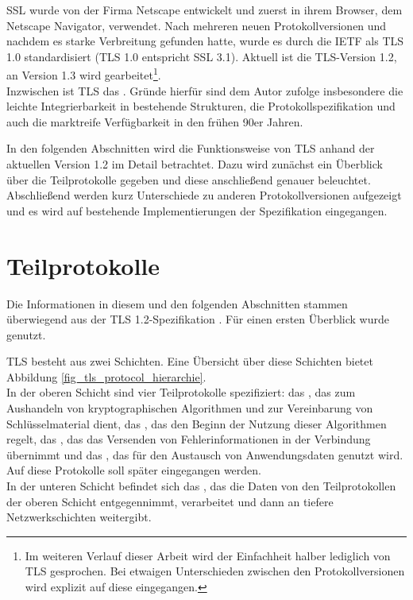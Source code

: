 SSL wurde von der Firma Netscape entwickelt und zuerst in ihrem Browser, dem Netscape Navigator, verwendet. Nach mehreren neuen Protokollversionen und nachdem es starke Verbreitung gefunden hatte, wurde es durch die IETF als TLS 1.0 standardisiert (TLS 1.0 entspricht SSL 3.1). Aktuell ist die TLS-Version 1.2, an Version 1.3 wird gearbeitet\footnote{
	Im weiteren Verlauf dieser Arbeit wird der Einfachheit halber lediglich von TLS gesprochen. Bei etwaigen Unterschieden zwischen den Protokollversionen wird explizit auf diese eingegangen.
}.\\
Inzwischen ist TLS das  \cite{schmeh09}. Gründe hierfür sind dem Autor zufolge insbesondere die leichte Integrierbarkeit in bestehende Strukturen, die  \cite{schmeh09} Protokollspezifikation und auch die marktreife Verfügbarkeit in den frühen 90er Jahren.

In den folgenden Abschnitten wird die Funktionsweise von TLS anhand der aktuellen Version 1.2 im Detail betrachtet. Dazu wird zunächst ein Überblick über die Teilprotokolle gegeben und diese anschließend genauer beleuchtet. Abschließend werden kurz Unterschiede zu anderen Protokollversionen aufgezeigt und es wird auf bestehende Implementierungen der Spezifikation eingegangen.

\section{Teilprotokolle}

Die Informationen in diesem und den folgenden Abschnitten stammen überwiegend aus der TLS 1.2-Spezifikation \cite{tls12}. Für einen ersten Überblick wurde \cite{eckert13} genutzt.

TLS besteht aus zwei Schichten. Eine Übersicht über diese Schichten bietet Abbildung \ref{fig_tls_protocol_hierarchie}.\\
In der oberen Schicht sind vier Teilprotokolle spezifiziert: das \handshakeprotocol{}, das zum Aushandeln von kryptographischen Algorithmen und zur Vereinbarung von Schlüsselmaterial dient, das \changecipherspecprotocol{}, das den Beginn der Nutzung dieser Algorithmen regelt, das \alertprotocol{}, das das Versenden von Fehlerinformationen in der Verbindung übernimmt und das \applicationdataprotocol{}, das für den Austausch von Anwendungsdaten genutzt wird. Auf diese Protokolle soll später eingegangen werden.\\ 
In der unteren Schicht befindet sich das \recordprotocol{}, das die Daten von den Teilprotokollen der oberen Schicht entgegennimmt, verarbeitet und dann an tiefere Netzwerkschichten weitergibt. 

